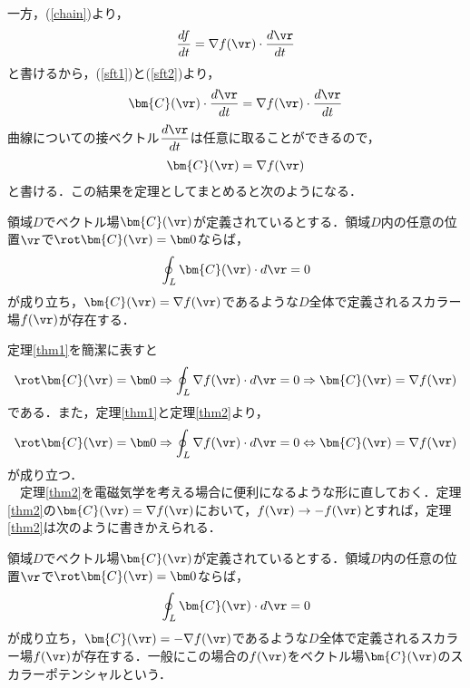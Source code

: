 一方，(\ref{chain})より，
\begin{align}\label{sft2}
\frac{df}{dt}=\nabla f(\vr)\cdot\frac{d\vr}{dt}
\end{align}
と書けるから，(\ref{sft1})と(\ref{sft2})より，
\begin{align}\label{sft3}
\bm{C}(\vr)\cdot\frac{d\vr}{dt}=\nabla f(\vr)\cdot\frac{d\vr}{dt}
\end{align}
曲線についての接ベクトル$\dfrac{d\vr}{dt}$は任意に取ることができるので，
\begin{align}\label{sft4}
\bm{C}(\vr)=\nabla f(\vr)
\end{align}
と書ける．この結果を定理としてまとめると次のようになる．
\begin{theorem}\label{thm2}
領域$D$でベクトル場$\bm{C}(\vr)$が定義されているとする．領域$D$内の任意の位置$\vr$で$\rot\bm{C}(\vr)=\bm0$ならば，
\begin{align}
\oint_L\bm{C}(\vr)\cdot d\vr=0
\end{align}
が成り立ち，$\bm{C}(\vr)=\nabla f(\vr)$であるような$D$全体で定義されるスカラー場$f(\vr)$が存在する．
\end{theorem}
定理\ref{thm1}を簡潔に表すと
\begin{align}
\rot\bm{C}(\vr)=\bm0\Rightarrow \oint_L\nabla f(\vr)\cdot d\vr=0\Rightarrow \bm{C}(\vr)=\nabla f(\vr)
\end{align}
である．また，定理\ref{thm1}と定理\ref{thm2}より，
\begin{align}
\rot\bm{C}(\vr)=\bm0\Rightarrow \oint_L\nabla f(\vr)\cdot d\vr=0\Leftrightarrow  \bm{C}(\vr)=\nabla f(\vr)
\end{align}
が成り立つ．\\
　定理\ref{thm2}を電磁気学を考える場合に便利になるような形に直しておく．定理\ref{thm2}の$\bm{C}(\vr)=\nabla f(\vr)$において，$f(\vr)\to -f(\vr)$とすれば，定理\ref{thm2}は次のように書きかえられる．
\begin{theorem}\label{thm3}
領域$D$でベクトル場$\bm{C}(\vr)$が定義されているとする．領域$D$内の任意の位置$\vr$で$\rot\bm{C}(\vr)=\bm0$ならば，
\begin{align}
\oint_L\bm{C}(\vr)\cdot d\vr=0
\end{align}
が成り立ち，$\bm{C}(\vr)=-\nabla f(\vr)$であるような$D$全体で定義されるスカラー場$f(\vr)$が存在する．一般にこの場合の$f(\vr)$をベクトル場$\bm{C}(\vr)$のスカラーポテンシャルという．
\end{theorem}








